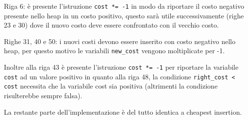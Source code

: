 \documentclass[a4paper,12pt]{report}
\begin{document}
\begin{legal}
  \item Riga 6: è presente l'istruzione \lstinline!cost *= -1! in modo da riportare il costo negativo presente nello heap in un costo positivo, questo sarà utile successivamente (righe 23 e 30) dove il nuovo costo deve essere confrontato con il vecchio costo.
  \item Righe 31, 40 e 50: i nuovi costi devono essere inserito con costo negativo nello heap, per questo motivo le variabili \lstinline!new_cost! vengono moltiplicate per -1.
  \item Inoltre alla riga 43 è presente l'istruzione \lstinline!cost *= -1! per riportare la variabile \lstinline!cost! ad un valore positivo in quanto alla riga 48, la condizione \lstinline!right_cost < cost! necessita che la variabile cost sia positiva (altrimenti la condizione risulterebbe sempre falsa).
\end{legal}
La restante parte dell'implementazione è del tutto identica a cheapest insertion.
\end{document}
